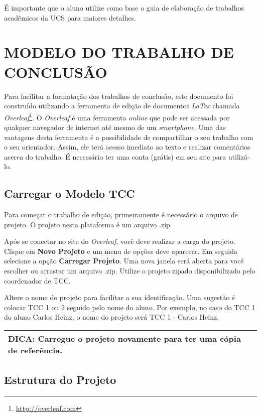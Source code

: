 É importante que o aluno utilize como base o guia de elaboração de trabalhos acadêmicos da UCS\cite{guiaUCS} para maiores detalhes.  

\section{MODELO DO TRABALHO DE CONCLUSÃO}
\label{sec:modeloTCC}

Para facilitar a formatação dos trabalhos de conclusão, este documento foi construído utilizando a ferramenta de edição de documentos \textit{LaTex} chamada \textit{Overleaf}\footnote{\url{http://overleaf.com}}. O \textit{Overleaf} é uma ferramenta \textit{online} que pode ser acessada por qualquer navegador de internet até mesmo de um \textit{smartphone}. Uma das vantagens desta ferramenta é a possibilidade de compartilhar o seu trabalho com o seu orientador. Assim, ele terá acesso imediato ao texto e realizar comentários acerca do trabalho. É necessário ter uma conta (grátis) em seu site para utilizá-lo. 

\subsection{Carregar o Modelo TCC} 
\label{subsec:loadTCC} 

Para começar o trabalho de edição, primeiramente é necessário o arquivo de projeto. O projeto nesta plataforma é um arquivo .zip. 

Após se conectar no site do \textit{Overleaf}, você deve realizar a carga do projeto. Clique em \textbf{Novo Projeto} e um menu de opções deve aparecer. Em seguida selecione a opção \textbf{Carregar Projeto}. Uma nova janela será aberta para você escolher ou arrastar um arquivo .zip. Utilize o projeto zipado disponibilizado pelo coordenador de \ac{TCC}. 

Altere o nome do projeto para facilitar a sua identificação. Uma sugestão é colocar TCC 1 ou 2 seguido pelo nome do aluno. Por exemplo, no caso do TCC 1 do aluno Carlos Heinz, o nome do projeto será TCC 1 - Carlos Heinz. 

\begin{tabular}{|l|c|} \hline
	DICA:  Carregue o projeto novamente para ter uma cópia de referência. 
                                                        \\\hline
\end{tabular}

\subsection{Estrutura do Projeto}
\label{sec:estruturaModelo} 

